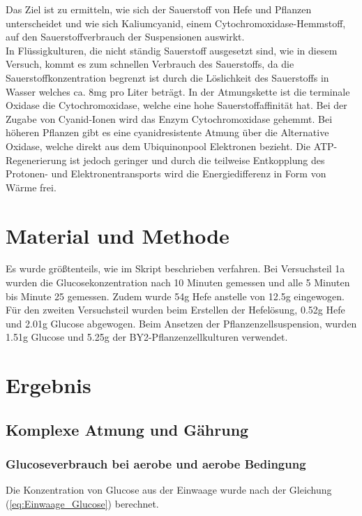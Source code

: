 \documentclass[10pt,a4paper]{article}
\begin{document}
		Das Ziel ist zu ermitteln, wie sich der Sauerstoff von Hefe und Pflanzen unterscheidet und wie sich Kaliumcyanid, einem Cytochromoxidase-Hemmstoff, auf den Sauerstoffverbrauch der Suspensionen auswirkt.\\
		 In Flüssigkulturen, die nicht ständig Sauerstoff ausgesetzt sind, wie in diesem Versuch, kommt es zum schnellen Verbrauch des Sauerstoffs, da die Sauerstoffkonzentration begrenzt ist durch die Löslichkeit des Sauerstoffs in Wasser welches ca. 8mg pro Liter beträgt. In der Atmungskette ist die terminale Oxidase die Cytochromoxidase, welche eine hohe Sauerstoffaffinität hat. Bei der Zugabe von Cyanid-Ionen wird das Enzym Cytochromoxidase gehemmt. Bei höheren Pflanzen gibt es eine cyanidresistente Atmung über die Alternative Oxidase, welche direkt aus dem Ubiquinonpool Elektronen bezieht. Die ATP-Regenerierung ist jedoch geringer und durch die teilweise Entkopplung des Protonen- und Elektronentransports wird die Energiedifferenz in Form von Wärme frei.\\
		 

	
	\section{Material und Methode}
	
	
	Es wurde größtenteils, wie im Skript beschrieben verfahren. Bei Versuchsteil 1a wurden die Glucosekonzentration nach 10 Minuten gemessen und alle 5 Minuten bis Minute 25 gemessen. Zudem wurde 54g Hefe anstelle von 12.5g eingewogen.\\
	Für den zweiten Versuchsteil wurden beim Erstellen der Hefelösung, 0.52g Hefe und 2.01g Glucose abgewogen. Beim Ansetzen der Pflanzenzellsuspension, wurden 1.51g Glucose und 5.25g der BY2-Pflanzenzellkulturen verwendet.
	
	\section{Ergebnis}
		\subsection{Komplexe Atmung und Gährung}
			\subsubsection{Glucoseverbrauch bei aerobe und aerobe Bedingung}
			Die Konzentration von Glucose aus der Einwaage wurde nach der Gleichung (\ref{eq:Einwaage_Glucose}) berechnet.\\
			
\end{document}
